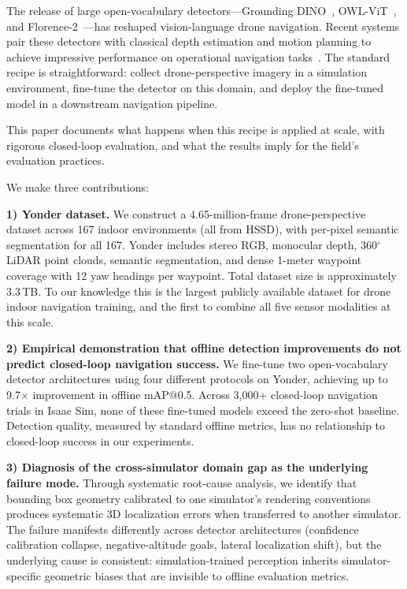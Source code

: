 \documentclass{article}
\begin{document}
The release of large open-vocabulary detectors---Grounding DINO~\cite{liu2024grounding}, OWL-ViT~\cite{minderer2023scaling}, and Florence-2~\cite{xiao2024florence}---has reshaped vision-language drone navigation. Recent systems pair these detectors with classical depth estimation and motion planning to achieve impressive performance on operational navigation tasks~\cite{anon2026closing,anon2026engineering}. The standard recipe is straightforward: collect drone-perspective imagery in a simulation environment, fine-tune the detector on this domain, and deploy the fine-tuned model in a downstream navigation pipeline.

This paper documents what happens when this recipe is applied at scale, with rigorous closed-loop evaluation, and what the results imply for the field's evaluation practices.

We make three contributions:

\textbf{1) Yonder dataset.} We construct a 4.65-million-frame drone-perspective dataset across 167 indoor environments (all from HSSD), with per-pixel semantic segmentation for all 167. Yonder includes stereo RGB, monocular depth, 360$^{\circ}$ LiDAR point clouds, semantic segmentation, and dense 1-meter waypoint coverage with 12 yaw headings per waypoint. Total dataset size is approximately 3.3\,TB. To our knowledge this is the largest publicly available dataset for drone indoor navigation training, and the first to combine all five sensor modalities at this scale.

\textbf{2) Empirical demonstration that offline detection improvements do not predict closed-loop navigation success.} We fine-tune two open-vocabulary detector architectures using four different protocols on Yonder, achieving up to 9.7$\times$ improvement in offline mAP@0.5. Across 3,000+ closed-loop navigation trials in Isaac Sim, none of these fine-tuned models exceed the zero-shot baseline. Detection quality, measured by standard offline metrics, has no relationship to closed-loop success in our experiments.

\textbf{3) Diagnosis of the cross-simulator domain gap as the underlying failure mode.} Through systematic root-cause analysis, we identify that bounding box geometry calibrated to one simulator's rendering conventions produces systematic 3D localization errors when transferred to another simulator. The failure manifests differently across detector architectures (confidence calibration collapse, negative-altitude goals, lateral localization shift), but the underlying cause is consistent: simulation-trained perception inherits simulator-specific geometric biases that are invisible to offline evaluation metrics.
\end{document}
